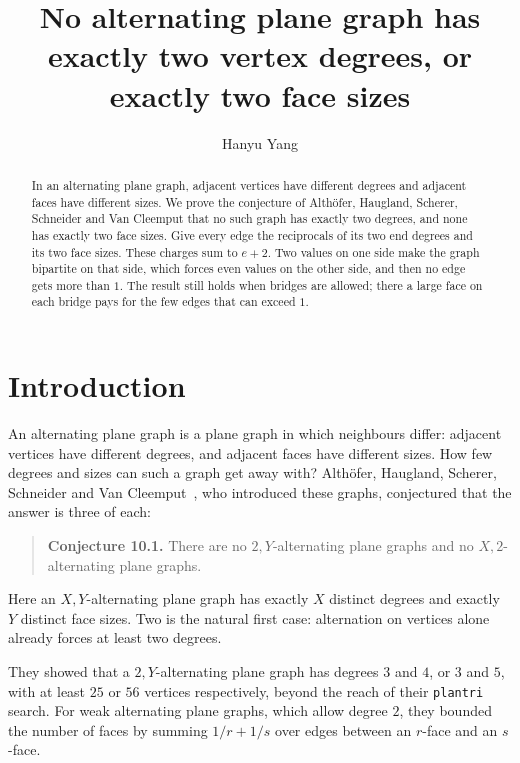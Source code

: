 \documentclass{amsart}
\theoremstyle{plain}
\theoremstyle{definition}
\theoremstyle{remark}
\begin{document}
\title[Two degrees or two face sizes]{No alternating plane graph has exactly two
       vertex degrees, or exactly two face sizes}
\author{Hanyu Yang}
\address{Independent researcher, California, USA}

\begin{abstract}
In an alternating plane graph, adjacent vertices have different degrees and
adjacent faces have different sizes. We prove the conjecture of Alth\"ofer,
Haugland, Scherer, Schneider and Van Cleemput that no such graph has exactly two
degrees, and none has exactly two face sizes. Give every edge the reciprocals of
its two end degrees and its two face sizes. These charges sum to $e+2$. Two
values on one side make the graph bipartite on that side, which forces even
values on the other side, and then no edge gets more than $1$. The result still
holds when bridges are allowed; there a large face on each bridge pays for the
few edges that can exceed $1$.
\end{abstract}

\maketitle

\section{Introduction}

An alternating plane graph is a plane graph in which neighbours differ: adjacent
vertices have different degrees, and adjacent faces have different sizes. How
few degrees and sizes can such a graph get away with? Alth\"ofer, Haugland,
Scherer, Schneider and Van Cleemput~\cite{AHSSV2015}, who introduced these
graphs, conjectured that the answer is three of each:

\begin{quote}
\textbf{Conjecture 10.1.} There are no $2,Y$-alternating plane graphs and no
$X,2$-alternating plane graphs.
\end{quote}

\noindent Here an $X,Y$-alternating plane graph has exactly $X$ distinct degrees
and exactly $Y$ distinct face sizes. Two is the natural first case: alternation
on vertices alone already forces at least two degrees.

They showed that a $2,Y$-alternating plane graph has degrees $3$ and $4$, or
$3$ and $5$, with at least $25$ or $56$ vertices respectively, beyond the reach
of their \texttt{plantri}~\cite{BM2007} search. For weak alternating plane
graphs, which allow degree $2$, they bounded the number of faces by summing
$1/r+1/s$ over edges between an $r$-face and an $s$-face.
\end{document}
